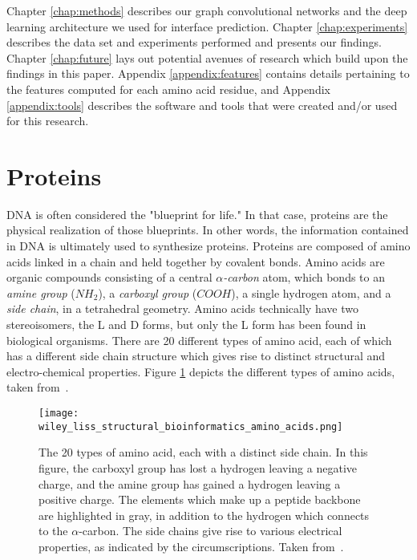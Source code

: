 Chapter \ref{chap:methods} describes our graph convolutional networks and the deep learning architecture we used for interface prediction. Chapter \ref{chap:experiments} describes the data set and experiments performed and presents our findings. Chapter \ref{chap:future} lays out potential avenues of research which build upon the findings in this paper. Appendix \ref{appendix:features} contains details pertaining to the features computed for each amino acid residue, and Appendix \ref{appendix:tools} describes the software and tools that were created and/or used for this research.

\section{Proteins}

DNA is often considered the "blueprint for life." 
In that case, proteins are the physical realization of those blueprints.
In other words, the information contained in DNA is ultimately used to synthesize proteins.
Proteins are composed of amino acids linked in a chain and held together by covalent bonds.
Amino acids are organic compounds consisting of a central \textit{$\alpha$-carbon} atom, which bonds to an \textit{amine group} ($NH_2$), a \textit{carboxyl group} ($COOH$), a single hydrogen atom, and a \textit{side chain}, in a tetrahedral geometry.
Amino acids technically have two stereoisomers, the L and D forms, but only the L form has been found in biological organisms\cite{scheeffink2003}.
There are 20 different types of amino acid, each of which has a different side chain structure which gives rise to distinct structural and electro-chemical properties. 
Figure \ref{fig:aminoacids} depicts the different types of amino acids, taken from~\cite{scheeffink2003}.


\begin{figure}
	\centering
	\texttt{[image: wiley\_liss\_structural\_bioinformatics\_amino\_acids.png]}
	\caption{The 20 types of amino acid, each with a distinct side chain. In this figure, the carboxyl group has lost a hydrogen leaving a negative charge, and the amine group has gained a hydrogen leaving a positive charge. The elements which make up a peptide backbone are highlighted in gray, in addition to the hydrogen which connects to the $\alpha$-carbon. The side chains give rise to various electrical properties, as indicated by the circumscriptions. Taken from~\cite{scheeffink2003}.}
	\label{fig:aminoacids}
\end{figure}

